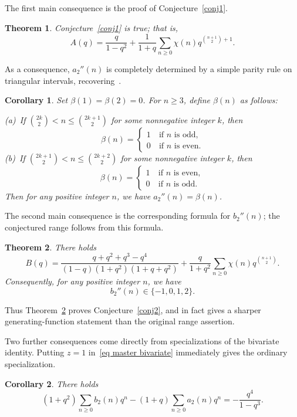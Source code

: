 \documentclass[10pt,a4paper]{amsart}
\newtheorem{theorem}    {Theorem}
\newtheorem{corollary}  {Corollary}
\numberwithin{equation}{section}
\newcommand{\fr}{\frac}
\begin{document}
The first main consequence is the proof of Conjecture~\ref{conj1}.
\begin{theorem}\label{thm main-1}
Conjecture~\ref{conj1} is true; that is,
\[
A(q)=\fr{q}{1-q^2}+\fr{1}{1+q}\sum_{n\geq 0} \chi(n) q^{\binom{n+1}{2}+1}.
\]
\end{theorem}
As a consequence, $a_2''(n)$ is completely determined by a simple parity rule on triangular intervals, recovering~\cite[Proposition 1]{Andrews-Bachraoui conjectures}.
\begin{corollary}\label{cor a2-0,1}
Set $\beta(1)=\beta(2)=0$.  For $n\geq 3$, define $\beta(n)$ as follows:

(a)\ If $\binom{2k}{2} < n\leq \binom{2k+1}{2}$ for some nonnegative integer $k$, then
\[
\beta(n)
=\begin{cases}
1 &\ \text{if $n$ is odd}, \\
0 &\ \text{if $n$ is even}.
\end{cases}
\]
(b)\ If $\binom{2k+1}{2} < n\leq \binom{2k+2}{2}$ for some nonnegative integer $k$, then
\[
\beta(n)
=\begin{cases}
1 &\ \text{if $n$ is even}, \\
0 &\ \text{if $n$ is odd}.
\end{cases}
\]
Then for any positive integer $n$, we have $a_2''(n)=\beta(n)$.
\end{corollary}

The second main consequence is the corresponding formula for $b_2''(n)$; the conjectured range follows from this formula.

\begin{theorem}\label{thm main-2}
There holds
\begin{equation}\label{conj2-id}
B(q)
=\fr{q+q^2+q^3-q^4}{(1-q)(1+q^2)(1+q+q^2)}+\fr{q}{1+q^2}\sum_{n\geq 0} \chi(n) q^{\binom{n+1}{2}}.
\end{equation}
Consequently, for any positive integer $n$, we have
\[
b_2''(n)\in\{-1,0,1,2\}.
\]
\end{theorem}

Thus Theorem~\ref{thm main-2} proves Conjecture~\ref{conj2}, and in fact gives a sharper generating-function statement than the original range assertion.

Two further consequences come directly from specializations of the bivariate identity.
Putting $z=1$ in~\eqref{eq master bivariate} immediately gives the ordinary specialization.
\begin{corollary}\label{cor ordinary relation}
There holds
\begin{equation}\label{eq ordinary relation}
(1+q^2)\sum_{n\ge 0} b_2(n)q^n-(1+q)\sum_{n\ge 0} a_2(n)q^n=-\frac{q^4}{1-q^3}.
\end{equation}
\end{corollary}
\end{document}
